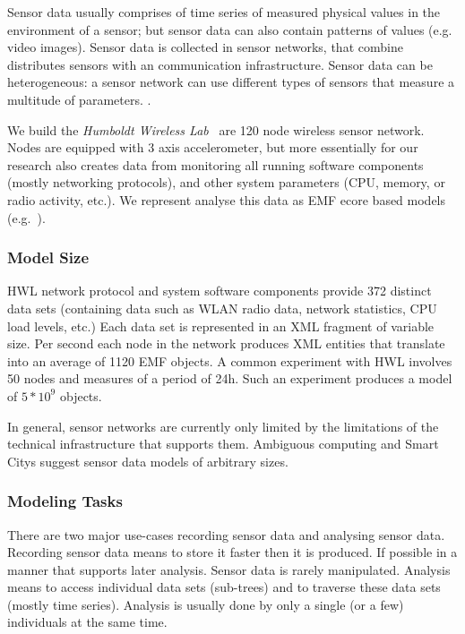 Sensor data usually comprises of time series of measured physical values in the environment of a sensor; but sensor data can also contain patterns of values (e.g. video images). Sensor data is collected in sensor networks, that combine distributes sensors with an communication infrastructure. Sensor data can be heterogeneous: a sensor network can use different types of sensors that measure a multitude of parameters. \cite{estrin, lynch}. 

We build the \emph{Humboldt Wireless Lab}~\cite{hwl} are 120 node wireless sensor network. Nodes are equipped with 3 axis accelerometer, but more essentially for our research also creates data from monitoring all running software components (mostly networking protocols), and other system parameters (CPU, memory, or radio activity, etc.). We represent analyse this data as EMF ecore based models (e.g.~\cite{clickwatch}).

\subsubsection*{Model Size}
HWL network protocol and system software components provide 372 distinct data sets (containing data such as WLAN radio data, network statistics, CPU load levels, etc.) Each data set is represented in an XML fragment of variable size. Per second each node in the network produces XML entities that translate into an average of 1120 EMF objects. A common experiment with HWL involves 50 nodes and measures of a period of 24h. Such an experiment produces a model of $5*10^9$ objects. 

In general, sensor networks are currently only limited by the limitations of the technical infrastructure that supports them. Ambiguous computing and Smart Citys suggest sensor data models of arbitrary sizes. 

\subsubsection*{Modeling Tasks}
There are two major use-cases recording sensor data and analysing sensor data. Recording sensor data means to store it faster then it is produced. If possible in a manner that supports later analysis. Sensor data is rarely manipulated. Analysis means to access individual data sets (sub-trees) and to traverse these data sets (mostly time series). Analysis is usually done by only a single (or a few) individuals at the same time. 


